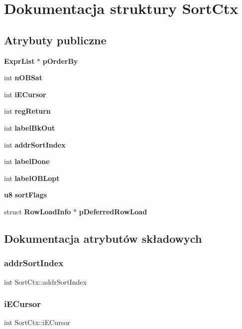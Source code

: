 \section{Dokumentacja struktury Sort\+Ctx}
\label{struct_sort_ctx}
\subsection*{Atrybuty publiczne}
\begin{DoxyCompactItemize}
\item 
\textbf{ Expr\+List} $\ast$ \textbf{ p\+Order\+By}
\item 
int \textbf{ n\+O\+B\+Sat}
\item 
int \textbf{ i\+E\+Cursor}
\item 
int \textbf{ reg\+Return}
\item 
int \textbf{ label\+Bk\+Out}
\item 
int \textbf{ addr\+Sort\+Index}
\item 
int \textbf{ label\+Done}
\item 
int \textbf{ label\+O\+B\+Lopt}
\item 
\textbf{ u8} \textbf{ sort\+Flags}
\item 
struct \textbf{ Row\+Load\+Info} $\ast$ \textbf{ p\+Deferred\+Row\+Load}
\end{DoxyCompactItemize}


\subsection{Dokumentacja atrybutów składowych}
\mbox{\label{struct_sort_ctx_ad4c264de37b3f3b9bbff55e34659ef11}} 
\subsubsection{addrSortIndex}
{\footnotesize\ttfamily int Sort\+Ctx\+::addr\+Sort\+Index}

\mbox{\label{struct_sort_ctx_acaf1633a51ccc836edd0594f90ed501b}} 
\subsubsection{iECursor}
{\footnotesize\ttfamily int Sort\+Ctx\+::i\+E\+Cursor}

\mbox{\label{struct_sort_ctx_abc19dcb503656023d5596aa31378e973}} 
